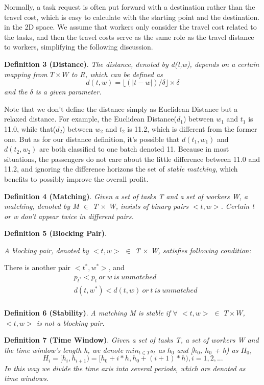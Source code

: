 \documentclass[color,twoside,amssymb,twocolumn]{article}
\begin{document}
Normally, a task request is often put forward with a destination rather than the travel cost, which is easy to calculate with the starting point and the destination. in the 2D space. We assume that workers only consider the travel cost related to the tasks, and then the travel costs serve as the same role as the travel distance to workers, simplifying the following discussion.

\textbf{Definition 3 (Distance)}. {\it The distance, denoted by d(t,w), depends on a certain mapping from $T \times W$ to $R$, which can be defined as 
	\begin{equation}
	d(t,w) = \lfloor (|t-w|)/\delta \rfloor \times \delta
	\end{equation}
	and the $\delta$ is a given parameter. }

Note that we don't define the distance simply as Euclidean Distance but a relaxed distance. For example, the Euclidean Distance($d_1$) between $w_1$ and $t_1$ is 11.0, while that($d_2$) between $w_2$ and $t_2$ is 11.2, which is different from the former one. But as for our distance definition, it's possible that $d(t_1,w_1)$ and $d(t_2,w_2)$ are both classified to one batch denoted 11. Because in most situations, the passengers do not care about the little difference between 11.0 and 11.2, and ignoring the difference horizons the set of {\it stable matching}, which benefits to possibly improve the overall profit.

\textbf{Definition 4 (Matching)}. {\it Given a set of tasks T and a set of workers W, a matching, denoted by M $\in$ T $\times$ W, insists of binary pairs  $< t, w >$. Certain t or w don't appear twice in different pairs.}


\textbf{Definition 5 (Blocking Pair)}. {\it A blocking pair, denoted by $< t, w >$ $\in$ T $\times$ W, satisfies following condition:
	
	There is another pair $< t^ *, w^ * >$, and
	\begin{equation}
	\begin{split}	
	&p_{t^*} < p_t\ or\ w\ is\ unmatched\\
	&d(t,w^*) < d(t,w)\ or\ t\ is\ unmatched\\
	\end{split}
	\end{equation}
}

\textbf{Definition 6 (Stability)}. {\it A matching M is stable if $\forall$ $< t, w >$ $\in$ $T \times W$, $< t, w >$ is not a blocking pair.}

\textbf{Definition 7 (Time Window)}. {\it Given a set of tasks T, a set of workers W and the time window's length h, we denote $min_{t \in T}s_t$ as $h_0$ and [$h_0$, $h_0$ + h) as $H_0$, 
	\begin{equation}
	H_i=[h_i,h_{i+1})=[h_0 + i * h, h_0 + (i + 1) * h),i=1,2,...
	\end{equation}
	In this way we divide the time axis into several periods, which are denoted as time windows. 
}
\end{document}
